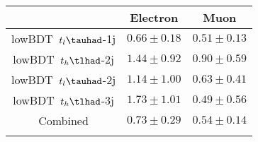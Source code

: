 \centering
\begin{tabular}{ccc} \toprule\toprule
 & Electron & Muon\\\midrule
lowBDT~$t_{l}\tauhad$-1j & $0.66\pm0.18$ & $0.51\pm0.13$\\
lowBDT~$t_{h}\tlhad$-2j & $1.44\pm0.92$ & $0.90\pm0.59$\\
lowBDT~$t_{l}\tauhad$-2j & $1.14\pm1.00$ & $0.63\pm0.41$\\
lowBDT~$t_{h}\tlhad$-3j & $1.73\pm1.01$ & $0.49\pm0.56$\\
Combined & $0.73\pm0.29$ & $0.54\pm0.14$\\
\bottomrule\bottomrule\\
\end{tabular}

